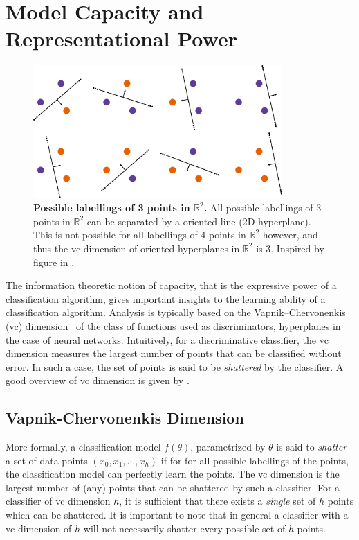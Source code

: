 \documentclass[thesis]{subfiles}
\begin{document}
    \section{Model Capacity and Representational Power}
    \begin{figure}
        \centering
        \includegraphics[width=0.85\textwidth]{Figs/PDF/allpossibler3}
        \caption[Possible labellings of 3 points in $\mathbb{R}^2$. ]{\textbf{Possible labellings of 3 points in $\mathbb{R}^2$.} All possible labellings of 3 points in $\mathbb{R}^2$ can be separated by a oriented line (2D hyperplane). This is not possible for all labellings of 4 points in $\mathbb{R}^2$ however, and thus the \gls{vc} dimension of oriented hyperplanes in $\mathbb{R}^2$ is 3. Inspired by figure in \citet{burges1998tutorial}.}\label{fig:vcdim_r2line}
    \end{figure}
    The information theoretic notion of capacity, that is the expressive power of a classification algorithm, gives important insights to the learning ability of a classification algorithm. Analysis is typically based on the Vapnik–Chervonenkis (\gls{vc}) dimension~\citep{vapnik2015uniform} of the class of functions used as discriminators, \eg hyperplanes in the case of neural networks. Intuitively, for a discriminative classifier, the \gls{vc} dimension measures the largest number of points that can be classified without error. In such a case, the set of points is said to be \emph{shattered} by the classifier. A good overview of \gls{vc} dimension is given by \citet{burges1998tutorial}.
    
    \subsection{Vapnik-Chervonenkis Dimension}
    More formally, a classification model $f(\theta)$, parametrized by $\theta$ is said to \emph{shatter} a set of data points $(x_0, x_1, \ldots, x_h)$ if for for all possible labellings of the points, the classification model can perfectly learn the points. The \gls{vc} dimension is the largest number of (any) points that can be shattered by such a classifier. For a classifier of \gls{vc} dimension $h$, it is sufficient that there exists a \emph{single} set of $h$ points which can be shattered. It is important to note that in general a classifier with a \gls{vc} dimension of $h$ will not necessarily shatter every possible set of $h$ points. 
    
\end{document}

